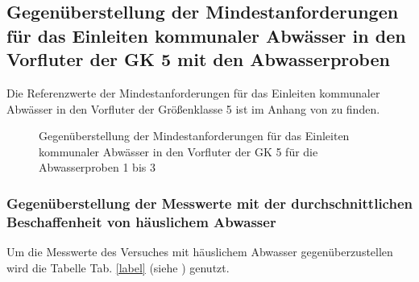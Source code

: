 \subsection*{Gegenüberstellung der Mindestanforderungen für das Einleiten kommunaler Abwässer in den Vorfluter der GK 5 mit den Abwasserproben}
Die Referenzwerte der Mindestanforderungen für das Einleiten kommunaler Abwässer in den Vorfluter der Größenklasse 5 ist im Anhang von \cite[S. 29]{Skript} zu finden.
\begin{figure}[h!]
	\caption{Gegenüberstellung der Mindestanforderungen für das Einleiten kommunaler Abwässer in den Vorfluter der GK 5 \linebreak für die Abwasserproben 1 bis 3}
\end{figure}
\FloatBarrier

\subsubsection{Gegenüberstellung der Messwerte mit der durchschnittlichen Beschaffenheit von häuslichem Abwasser}

Um die Messwerte des Versuches mit häuslichem Abwasser gegenüberzustellen wird die Tabelle Tab. \ref{label} (siehe \cite[S. 29]{Skript}) genutzt.

